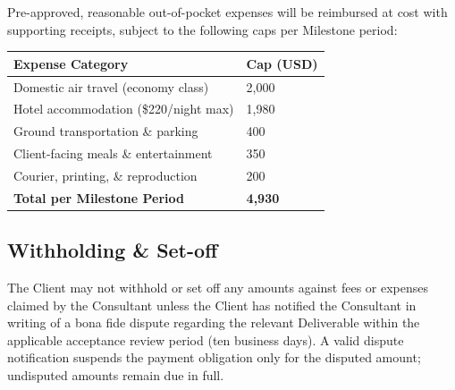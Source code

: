 Pre-approved, reasonable out-of-pocket expenses will be reimbursed at cost with
supporting receipts, subject to the following caps per Milestone period:

\vspace{6pt}
\begin{tabular}{@{} L{5.5cm} R{3cm} @{}}
  \toprule
  \textbf{Expense Category} & \textbf{Cap (USD)} \\
  \midrule
  Domestic air travel (economy class) & 2{,}000 \\
  Hotel accommodation (\$220/night max) & 1{,}980 \\
  Ground transportation \& parking    & 400 \\
  Client-facing meals \& entertainment & 350 \\
  Courier, printing, \& reproduction  & 200 \\
  \midrule
  \textbf{Total per Milestone Period}  & \textbf{4{,}930} \\
  \bottomrule
\end{tabular}
\label{tab:expenses}

\vspace{8pt}

\noindent{}

\subsection{Withholding \& Set-off}

The Client may not withhold or set off any amounts against fees or expenses claimed by
the Consultant unless the Client has notified the Consultant in writing of a bona fide
dispute regarding the relevant Deliverable within the applicable acceptance review period
(ten business days). A valid dispute notification suspends the payment obligation only
for the disputed amount; undisputed amounts remain due in full.
